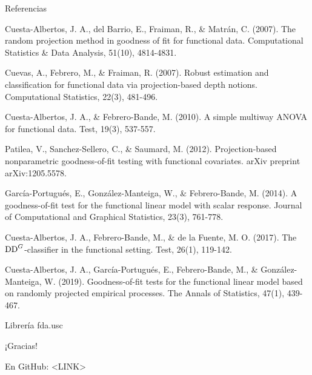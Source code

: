 \documentclass[10pt,spanish]{beamer}\usepackage[]{graphicx}\usepackage[]{color}
\begin{document}
\begin{frame}[shrink=30]{Referencias}

\appendix
\begin{thebibliography}{References}
Cuesta-Albertos, J. A., del Barrio,
E., Fraiman, R., \& Matrán, C. (2007). The random projection method
in goodness of fit for functional data. Computational Statistics \&
Data Analysis, 51(10), 4814-4831.

Cuevas, A., Febrero, M., \& Fraiman,
R. (2007). Robust estimation and classification for functional data
via projection-based depth notions. Computational Statistics, 22(3),
481-496.

Cuesta-Albertos, J. A., \& Febrero-Bande,
M. (2010). A simple multiway ANOVA for functional data. Test, 19(3),
537-557.

Patilea, V., Sanchez-Sellero,
C., \& Saumard, M. (2012). Projection-based nonparametric goodness-of-fit
testing with functional covariates. arXiv preprint arXiv:1205.5578.

García-Portugués, E., González-Manteiga,
W., \& Febrero-Bande, M. (2014). A goodness-of-fit test for the functional
linear model with scalar response. Journal of Computational and Graphical
Statistics, 23(3), 761-778. 

Cuesta-Albertos, J. A., Febrero-Bande,
M., \& de la Fuente, M. O. (2017). The $\hbox{DD}^{G}$-classifier
in the functional setting. Test, 26(1), 119-142.

Cuesta-Albertos, J. A., García-Portugués,
E., Febrero-Bande, M., \& González-Manteiga, W. (2019). Goodness-of-fit
tests for the functional linear model based on randomly projected
empirical processes. The Annals of Statistics, 47(1), 439-467.

 Librería fda.usc
\end{thebibliography}
\end{frame}
%
\begin{frame}{¡Gracias!}

En GitHub: <LINK>

\end{frame}
\end{document}

